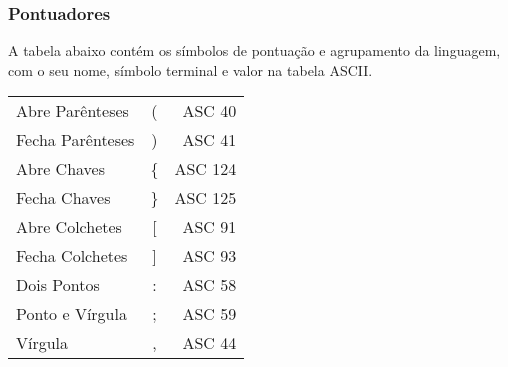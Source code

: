 \documentclass[a4paper,10pt]{article}
\begin{document}
    \subsubsection{Pontuadores}
    A tabela abaixo cont\'em os s\'imbolos de pontua\c{c}\~ao e agrupamento da linguagem, com o seu nome, s\'imbolo terminal e valor na tabela ASCII.
    \begin{center}
    \begin{tabular}{| l | c | r |}
      \hline
	    Abre Par\^enteses & ( & ASC 40\\
	    Fecha Par\^enteses & ) & ASC 41\\
	    Abre Chaves & \{ & ASC 124\\
	    Fecha Chaves & \} & ASC 125\\
	    Abre Colchetes & [ & ASC 91\\
	    Fecha Colchetes & ] & ASC 93\\
	    Dois Pontos & : & ASC 58\\
	    Ponto e V\'irgula & ; & ASC 59\\
	    V\'irgula & , & ASC 44 \\
      \hline
    \end{tabular}
    \end{center}
  
\end{document}
